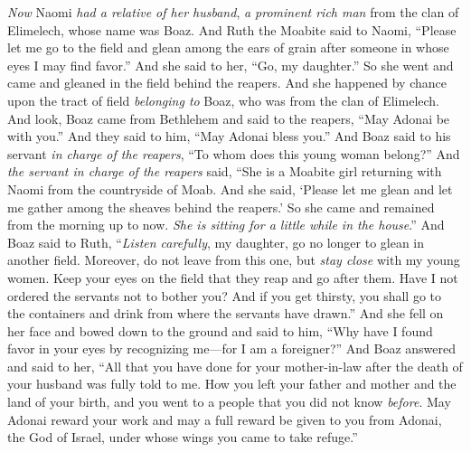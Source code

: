 \begin{biblechapter} %
 \textit{Now} Naomi \textit{had a relative of her husband}, \textit{a prominent rich man} from the clan of Elimelech, whose name was Boaz.
\verse And Ruth the Moabite said to Naomi, “Please let me go to the field and glean among the ears of grain after someone in whose eyes I may find favor.” And she said to her, “Go, my daughter.”
\verse So she went and came and gleaned in the field behind the reapers. And she happened by chance upon the tract of field \textit{belonging to} Boaz, who was from the clan of Elimelech.
\verse And look, Boaz came from Bethlehem and said to the reapers, “May Adonai be with you.” And they said to him, “May Adonai bless you.”
\verse And Boaz said to his servant \textit{in charge of the reapers}, “To whom does this young woman belong?”
\verse And \textit{the servant in charge of the reapers} said, “She is a Moabite girl returning with Naomi from the countryside of Moab.
\verse And she said, ‘Please let me glean and let me gather among the sheaves behind the reapers.’ So she came and remained from the morning up to now. \textit{She is sitting for a little while in the house}.”
\verse And Boaz said to Ruth, “\textit{Listen carefully}, my daughter, go no longer to glean in another field. Moreover, do not leave from this one, but \textit{stay close} with my young women.
\verse Keep your eyes on the field that they reap and go after them. Have I not ordered the servants not to bother you? And if you get thirsty, you shall go to the containers and drink from where the servants have drawn.”
\verse And she fell on her face and bowed down to the ground and said to him, “Why have I found favor in your eyes by recognizing me—for I am a foreigner?”
\verse And Boaz answered and said to her, “All that you have done for your mother-in-law after the death of your husband was fully told to me. How you left your father and mother and the land of your birth, and you went to a people that you did not know \textit{before}.
\verse May Adonai reward your work and may a full reward be given to you from Adonai, the God of Israel, under whose wings you came to take refuge.”

\end{biblechapter}
